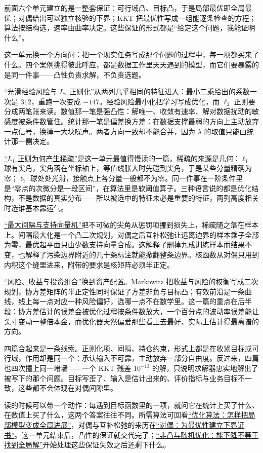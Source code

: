 前面六个单元建立的是一整套保证：可行域凸、目标凸，于是局部最优即全局最优；对偶给出可以独立核验的下界；KKT 把最优性写成一组能逐条检查的方程；算法按结构选，速率由曲率决定。这些保证的形式都是``给定这个问题，我能证明什么''。

这一单元换一个方向问：把一个现实任务写成那个问题的过程中，每一项都买来了什么。四个案例挑得彼此呼应，都是数据工作里天天遇到的模型，而它们要暴露的是同一件事——凸性负责求解，不负责选题。

\hyperref[sec:09-Convex-Optimization/07-Applications/01]{``\texorpdfstring{光滑经验风险与 \(L_2\) 正则化}{光滑经验风险与 L2 正则化}''}从两列几乎相同的特征进入：最小二乘给出的系数一次是 \(312\)，重跑一次变成 \(-147\)。经验风险最小化把学习写成优化，而 \(\ell_2\) 正则要分成两笔账来读。数值那一笔是强凸性：解唯一、收敛有速率、解对数据扰动的敏感度被条件数管住。统计那一笔是偏差换方差：在数据支撑最弱的方向上主动放弃一点信号，换掉一大块噪声。两者方向一致却不能合并，因为 \(\lambda\) 的取值只能由统计那一侧决定。

\hyperref[sec:09-Convex-Optimization/07-Applications/02]{``\texorpdfstring{\(L_1\) 正则为何产生稀疏}{L1 正则为何产生稀疏}''}是这一单元最值得慢读的一篇。稀疏的来源是几何：\(\ell_1\) 球有尖角，尖角落在坐标轴上，等值线胀大时先碰到尖角，于是某些分量精确为零；\(\ell_2\) 球处处光滑，接触点上各分量一般都不为零。同一件事在一阶条件里是``零点的次微分是一段区间''，在算法里是软阈值算子。三种语言说的都是优化结构，不是数据的真实分布——所以被选中的特征未必是重要的特征，两列高度相关时选谁基本靠运气。

\hyperref[sec:09-Convex-Optimization/07-Applications/03]{``最大间隔与支持向量机''}把不可微的尖角从惩罚项挪到损失上，稀疏随之落在样本上。间隔最大化是一个凸二次规划，对偶之后互补松弛让远离边界的样本乘子全部为零，最优超平面只由少数支持向量合成。这解释了删掉九成训练样本而结果不变，也解释了污染边界附近的几十条标注就能掀翻整条边界。核函数从对偶只用到内积这个缝里进来，附带的要求是核矩阵必须半正定。

\hyperref[sec:09-Convex-Optimization/07-Applications/04]{``风险、收益与投资组合''}换到资产配置。Markowitz 把收益与风险的权衡写成二次规划，协方差矩阵的半正定性同时保证了方差非负与目标凸；有效前沿是一条曲线，线上每一点对应一种风险偏好，选哪一点不在数学里。这一篇的重点在后半段：协方差估计的误差会被优化过程按条件数放大，一个百分点的波动率误差能让头寸变动一整倍本金，而优化器天然偏爱那些看上去最好、实际上估计得最离谱的方向。

四篇合起来是一条线索。正则化项、间隔、持仓约束，形式上都是在收紧目标或可行域，作用却是同一个：承认输入不可靠，主动放弃一部分自由度。反过来，四篇也四次撞上同一堵墙——一个 KKT 残差 \(10^{-13}\) 的解，只说明求解器忠实地解出了被写下的那个问题。目标写歪了、输入是估计出来的、评价指标与业务目标不一致，这些都不会体现在对偶间隙里。

读的时候可以带一个动作：每遇到目标函数里的一项，就问它在统计上买了什么、在数值上买了什么，这两个答案往往不同。所需算法可回看\hyperref[ch:076]{``优化算法：怎样把局部模型变成全局进展''}，对偶与互补松弛的来历在\hyperref[ch:075]{``对偶：为最优性建立下界证书''}。这一单元结束后，凸性的保证就交代完了；\hyperref[ch:078]{``非凸与随机优化：能下降不等于找到全局解''}开始处理这些保证失效之后还剩下什么。
